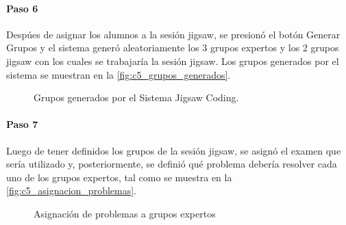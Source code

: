 \paragraph{Paso 6}
Despúes de asignar los alumnos a la sesión jigsaw, se presionó el botón Generar Grupos y el sistema generó aleatoriamente los 3 grupos expertos y los 2 grupos jigsaw con los cuales se trabajaría la sesión jigsaw. Los grupos generados por el sistema se muestran en la \autoref{fig:c5_grupos_generados}.

\begin{figure}[h!]
	\centering
	\caption{Grupos generados por el Sistema Jigsaw Coding.}
	\label{fig:c5_grupos_generados}
\end{figure}

\paragraph{Paso 7}
Luego de tener definidos los grupos de la sesión jigsaw, se asignó el examen que sería utilizado y, posteriormente, se definió qué problema debería resolver cada uno de los grupos expertos, tal como se muestra en la \autoref{fig:c5_asignacion_problemas}.

\begin{figure}[h!]
	\centering
	\caption{Asignación de problemas a grupos expertos}
	\label{fig:c5_asignacion_problemas}
\end{figure}

